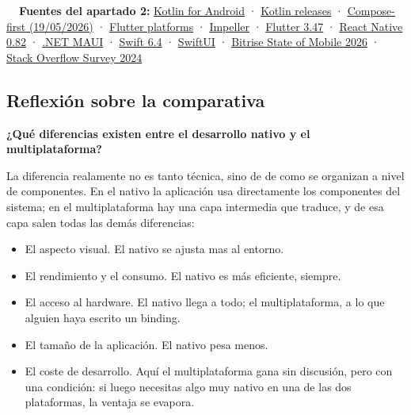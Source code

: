 \documentclass[11pt,a4paper]{article}
\newcommand{\campo}[1]{\textbf{\color{ink}#1}}
\begin{document}
	\begin{fuentesbox}
		\textbf{\color{muted}\faBook\ \ Fuentes del apartado 2:}
		\href{https://developer.android.com/kotlin/first}{Kotlin for Android} ·
		\href{https://kotlinlang.org/docs/releases.html}{Kotlin releases} ·
		\href{https://developer.android.com/blog/posts/android-ui-development-is-compose-first}{Compose-first (19/05/2026)} ·
		\href{https://docs.flutter.dev/reference/supported-platforms}{Flutter platforms} ·
		\href{https://docs.flutter.dev/perf/impeller}{Impeller} ·
		\href{https://docs.flutter.dev/release/whats-new}{Flutter 3.47} ·
		\href{https://reactnative.dev/blog/2025/10/08/react-native-0.82}{React Native 0.82} ·
		\href{https://learn.microsoft.com/dotnet/maui/what-is-maui}{.NET MAUI} ·
		\href{https://www.swift.org/blog/swift-6.4-released/}{Swift 6.4} ·
		\href{https://developer.apple.com/swiftui/}{SwiftUI} ·
		\href{https://bitrise.io/reports/state-of-mobile-development-2026}{Bitrise State of Mobile 2026} ·
		\href{https://survey.stackoverflow.co/2024/technology/}{Stack Overflow Survey 2024}
	\end{fuentesbox}
	
	\subsection{Reflexión sobre la comparativa}
	
	\campo{¿Qué diferencias existen entre el desarrollo nativo y el multiplataforma?}
	
	La diferencia realamente no es tanto técnica, sino de de como se organizan a nivel de componentes. En el nativo la aplicación usa directamente los componentes del sistema; en el multiplataforma hay una capa intermedia que traduce, y de esa capa salen todas las demás diferencias:
	\begin{itemize}[leftmargin=*,itemsep=0.2em,topsep=0.2em]
		\item El aspecto visual. El nativo se ajusta mas al entorno.
		\item El rendimiento y el consumo. El nativo es más eficiente, siempre.
		\item El acceso al hardware. El nativo llega a todo; el multiplataforma, a lo que alguien haya escrito un binding.
		\item El tamaño de la aplicación. El nativo pesa menos.
		\item El coste de desarrollo. Aquí el multiplataforma gana sin discusión, pero con una condición: si luego necesitas algo muy nativo en una de las dos plataformas, la ventaja se evapora.
	\end{itemize}
	
\end{document}
